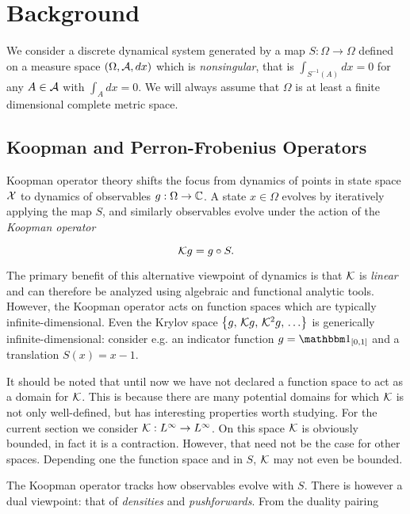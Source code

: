 
\section{Background}

We consider a discrete dynamical system generated by a map $S : \Omega \to \Omega$ defined 
on a measure space $( \Omega, \mathcal{A}, dx )$ which is \emph{nonsingular}, that is 
$\int_{S^{-1} (A)} dx = 0$ for any $A \in \mathcal{A}$ with $\int_A dx = 0$. We will always 
assume that $\Omega$ is at least a finite dimensional complete metric space. 


\subsection{Koopman and Perron-Frobenius Operators}

Koopman operator theory shifts the focus from dynamics of points in state space $\mathcal{X}$ to 
dynamics of observables $g : \Omega \to \mathbb{C}$. A state $x \in \Omega$ evolves by iteratively 
applying the map $S$, and similarly observables evolve under the action of the 
\emph{Koopman operator}

\begin{equation}
    \mathcal{K} g = g \circ S . 
\end{equation}

The primary benefit of this alternative viewpoint of dynamics is that $\mathcal{K}$ is 
\emph{linear} and can therefore be analyzed using algebraic and functional analytic tools. 
However, the Koopman operator acts on function spaces which are typically 
infinite-dimensional. Even the Krylov space 
$\left\{ g,\, \mathcal{K} g,\, \mathcal{K}^2 g,\, \ldots \right\}$ is generically infinite-dimensional: 
consider e.g. an indicator function $g = \bbone_{\left[ 0, 1 \right]}$ and a translation 
$S (x) = x - 1$. 

It should be noted that until now we have not declared a function space to act as a domain 
for $\mathcal{K}$. This is because there are many potential domains for which $\mathcal{K}$ is not 
only well-defined, but has interesting properties worth studying. For the current section 
we consider $\mathcal{K} : L^\infty \to L^\infty$. On this space $\mathcal{K}$ is obviously bounded, 
in fact it is a contraction. However, that need not be the case for other spaces. Depending 
one the function space and in $S$, $\mathcal{K}$ may not even be bounded. 

The Koopman operator tracks how observables evolve with $S$. There is however a dual 
viewpoint: that of \emph{densities} and \emph{pushforwards}. From the duality pairing

